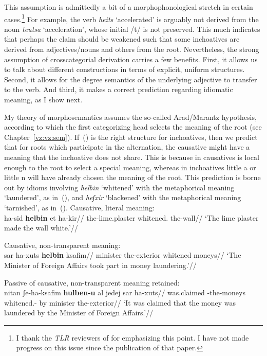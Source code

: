 This assumption is admittedly a bit of a morphophonological stretch in certain cases.\footnote{I thank the \emph{TLR} reviewers of \cite{kastner19tlr} for emphasizing this point. I have not made progress on this issue since the publication of that paper.} For example, the verb \emph{hei{ts}} `accelerated' is arguably not derived from the noun \emph{teu{ts}a} `acceleration', whose initial /t/ is not preserved. This much indicates that perhaps the claim should be weakened such that some inchoatives are derived from adjectives/nouns and others from the root. Nevertheless, the strong assumption of crosscategorial derivation carries a few benefits. First, it allows us to talk about different constructions in terms of explicit, uniform structures. Second, it allows for the degree semantics of the underlying adjective to transfer to the verb. And third, it makes a correct prediction regarding idiomatic meaning, as I show next.

My theory of morphosemantics assumes the so-called Arad/Marantz hypothesis, according to which the first categorizing head selects the meaning of the root (see Chapter~\ref{vz:vz:sem}). If~(\lastx) is the right structure for inchoatives, then we predict that for roots which participate in the alternation, the causative might have a meaning that the inchoative does not share. This is because in causatives {\vd} is local enough to the root to select a special meaning, whereas in inchoatives little a or little n will have already chosen the meaning of the root. This prediction is borne out by idioms involving \emph{helbin} `whitened' with the metaphorical meaning `laundered', as in~(\nextx), and \emph{heʃxir} `blackened' with the metaphorical meaning `tarnished', as in~(\anextx).
\pex
	\a Causative, literal meaning:\\
		\begingl
			\gla ha-sid \textbf{helbin} et ha-kir//
			\glb the-lime.plaster whitened.  the-wall//
			\glft `The lime plaster made the wall white.'//
		\endgl
	
	\a Causative, non-transparent meaning:\\
		\begingl
			\gla sar ha-xuts \textbf{helbin} ksafim//
			\glb minister the-exterior whitened moneys//
			\glft `The Minister of Foreign Affairs took part in money laundering.'//
		\endgl
	
	\a Passive of causative, non-transparent meaning retained:\\
		\begingl
			\gla nitan ʃe-ha-ksafim \textbf{hulben-u} {al jedej} sar ha-xuts//
			\glb was.claimed -the-moneys whitened.- by minister the-exterior//
			\glft `It was claimed that the money was laundered by the Minister of Foreign Affairs.'//
		\endgl
	
